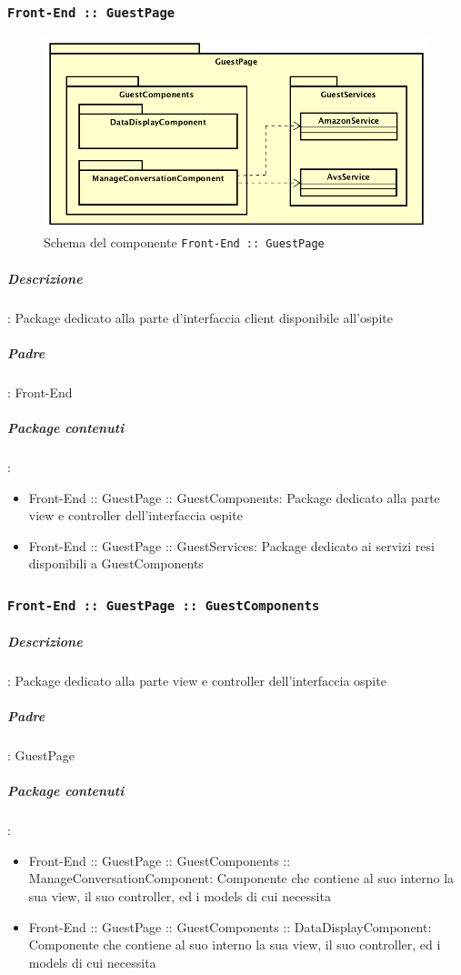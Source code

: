 \documentclass[../DefinizioneDiProdotto_v3.0.0.tex]{subfiles}
\begin{document}
	\newpage
	\subsubsection{\texttt{Front-End :: GuestPage}}
	\begin{figure}[!h]
		\centering
		\includegraphics[scale=0.7]{Architettura/Front-End/GuestPage/GuestPage.png}
		\caption{Schema del componente \texttt{Front-End :: GuestPage}}
	\end{figure}

			\subparagraph{Descrizione}: Package dedicato alla parte d'interfaccia client disponibile all'ospite
			\subparagraph{Padre}: Front-End
			\subparagraph{Package contenuti}:
			\begin{itemize}
				\item Front-End :: GuestPage :: GuestComponents: Package dedicato alla parte view e controller dell'interfaccia ospite
				\item Front-End :: GuestPage :: GuestServices: Package dedicato ai servizi resi disponibili a GuestComponents
			\end{itemize}


	\newpage
	\subsubsection{\texttt{Front-End :: GuestPage :: GuestComponents}}

			\subparagraph{Descrizione}: Package dedicato alla parte view e controller dell'interfaccia ospite
			\subparagraph{Padre}: GuestPage
			\subparagraph{Package contenuti}:
			\begin{itemize}
				\item Front-End :: GuestPage :: GuestComponents :: ManageConversationComponent: Componente che contiene al suo interno la sua view, il suo controller, ed i models di cui necessita
				\item Front-End :: GuestPage :: GuestComponents :: DataDisplayComponent: Componente che contiene al suo interno la sua view, il suo controller, ed i models di cui necessita
			\end{itemize}
\end{document}
